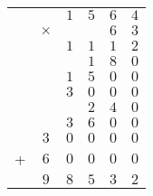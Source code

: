 \documentclass{standalone}
\begin{document}
\begin{tabular}{cccccc}
	& & $1$ & $5$ & $6$ & $4$ \\
	& $\times$ &  & & $6$ & $3$ \\ \hline
	& &{\tiny $1$} & {\tiny $1$} & $1$ & $2$ \\
	& & & $1$ & $8$ & $0$ \\
	& & $1$ & $5$ & $0$ & $0$ \\
	&  & $3$ & $0$ & $0$ & $0$ \\    
	& & & $2$ & $4$ & $0$ \\
	& & $3$ & $6$ & $0$ & $0$ \\
	& $3$ & $0$ & $0$ & $0$ & $0$ \\     
	+ & $6$ & $0$ & $0$ & $0$ & $0$ \\ \hline
	& $9$ & $8$ & $5$ & $3$ & $2$ 
\end{tabular}
\end{document}
